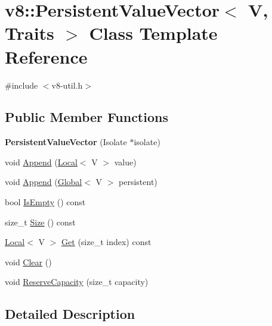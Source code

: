 \hypertarget{classv8_1_1PersistentValueVector}{}\section{v8\+:\+:Persistent\+Value\+Vector$<$ V, Traits $>$ Class Template Reference}
\label{classv8_1_1PersistentValueVector}


{\ttfamily \#include $<$v8-\/util.\+h$>$}

\subsection*{Public Member Functions}
\begin{DoxyCompactItemize}
\item 
\mbox{\label{classv8_1_1PersistentValueVector_ab6b9994133c30359ad7a02d3cc05219c}} 
{\bfseries Persistent\+Value\+Vector} (Isolate $\ast$isolate)
\item 
void \mbox{\hyperlink{classv8_1_1PersistentValueVector_a02376c6d16be29084db46f65473477fb}{Append}} (\mbox{\hyperlink{classv8_1_1Local}{Local}}$<$ V $>$ value)
\item 
void \mbox{\hyperlink{classv8_1_1PersistentValueVector_ad076923fd0046196670e87e996582546}{Append}} (\mbox{\hyperlink{classv8_1_1Global}{Global}}$<$ V $>$ persistent)
\item 
bool \mbox{\hyperlink{classv8_1_1PersistentValueVector_aa45dd4d1ee94a2c199a28a0bb2e432f1}{Is\+Empty}} () const
\item 
size\+\_\+t \mbox{\hyperlink{classv8_1_1PersistentValueVector_adf4e13701de97acc753ca294c66b9f35}{Size}} () const
\item 
\mbox{\hyperlink{classv8_1_1Local}{Local}}$<$ V $>$ \mbox{\hyperlink{classv8_1_1PersistentValueVector_a0788f334c7f61355863244379042ce76}{Get}} (size\+\_\+t index) const
\item 
void \mbox{\hyperlink{classv8_1_1PersistentValueVector_ad07f449c2004b4f3d91e58cabde99a53}{Clear}} ()
\item 
void \mbox{\hyperlink{classv8_1_1PersistentValueVector_ad4cccfee3a275986578276efe0c78510}{Reserve\+Capacity}} (size\+\_\+t capacity)
\end{DoxyCompactItemize}


\subsection{Detailed Description}
